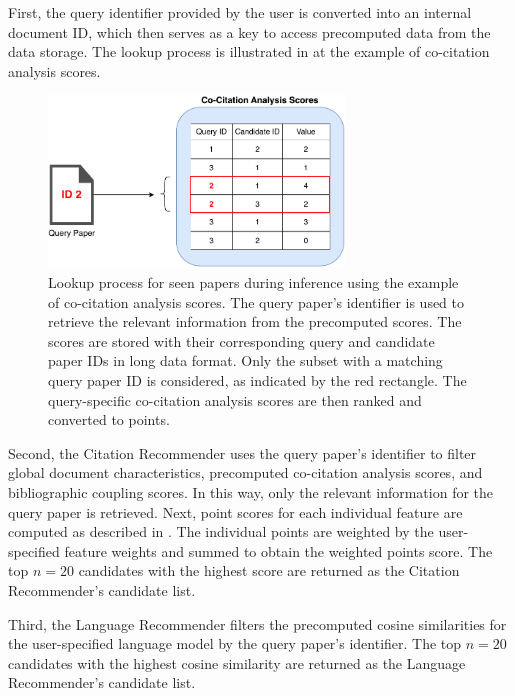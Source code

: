 First, the query identifier provided by the user is converted into an internal document ID, which then serves as a key to access precomputed data from the data storage.
The lookup process is illustrated in  at the example of co-citation analysis scores.

\begin{figure}[ht!]
    \centering
    \includegraphics[width=0.7\textwidth]{diagrams/inference_lookup.pdf}
    \caption[Inference Lookup]{Lookup process for seen papers during inference using the example of co-citation analysis scores. The query paper's identifier is used to retrieve the relevant information from the precomputed scores. The scores are stored with their corresponding query and candidate paper IDs in long data format. Only the subset with a matching query paper ID is considered, as indicated by the red rectangle. The query-specific co-citation analysis scores are then ranked and converted to points.}
    \label{fig:inference-lookup}
\end{figure}

Second, the Citation Recommender uses the query paper's identifier to filter global document characteristics, precomputed co-citation analysis scores, and bibliographic coupling scores.
In this way, only the relevant information for the query paper is retrieved.
Next, point scores for each individual feature are computed as described in . The individual points are weighted by the user-specified feature weights and summed to obtain the weighted points score. The top $n=20$ candidates with the highest score are returned as the Citation Recommender's candidate list.

Third, the Language Recommender filters the precomputed cosine similarities for the user-specified language model by the query paper's identifier.
The top $n=20$ candidates with the highest cosine similarity are returned as the Language Recommender's candidate list.

